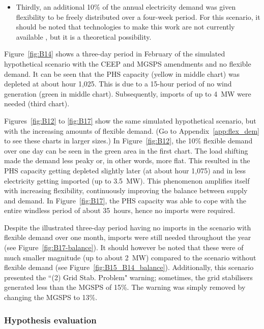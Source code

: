 \begin{itemize}
	\item Thirdly, an additional 10\% of the annual electricity demand was given flexibility to be freely distributed over a four-week period.
	For this scenario, it should be noted that technologies to make this work are not currently available \citep{Lund2017}, but it is a theoretical possibility.
\end{itemize}

Figure~\ref{fig:B14} shows a three-day period in February of the simulated hypothetical scenario with the CEEP and MGSPS amendments and no flexible demand.
It can be seen that the PHS capacity (yellow in  middle chart) was depleted at about hour 1,025.
This is due to a 15-hour period of no wind generation (green in middle chart).
Subsequently, imports of up to 4~MW were needed (third chart).

Figures~\ref{fig:B12} to \ref{fig:B17} show the same simulated hypothetical scenario, but with the increasing amounts of flexible demand.
(Go to Appendix~\ref{app:flex_dem} to see these charts in larger sizes.)
In Figure~\ref{fig:B12}, the 10\% flexible demand over one day can be seen in the green area in the first chart.
The load shifting made the demand less peaky or, in other words, more flat.
This resulted in the PHS capacity getting depleted slightly later (at about hour 1,075) and in less electricity getting imported (up to 3.5~MW).
This phenomenon amplifies itself with increasing flexibility, continuously improving the balance between supply and demand.
In Figure~\ref{fig:B17}, the PHS capacity was able to cope with the entire windless period of about 35~hours, hence no imports were required.



Despite the illustrated three-day period having no imports in the scenario with flexible demand over one month, imports were still needed throughout the year (see Figure~\ref{fig:B17-balance}).
It should however be noted that these were of much smaller magnitude (up to about 2~MW) compared to the scenario without flexible demand (see Figure~\ref{fig:B15_B14_balance}).
Additionally, this scenario presented the ``(2) Grid Stab. Problem" warning; sometimes, the grid stabilisers generated less than the MGSPS of 15\%.
The warning was simply removed by changing the MGSPS to 13\%.



\subsubsection{Hypothesis evaluation}

